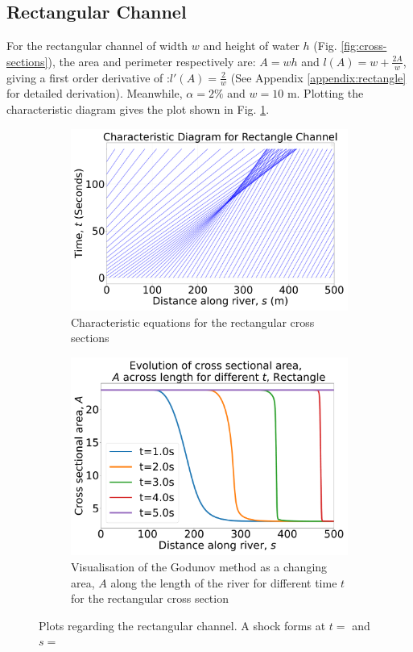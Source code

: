 \documentclass[12pt]{article}
\begin{document}
\subsection{Rectangular Channel}
For the rectangular channel of width $w$ and height of water $h$ (Fig. \ref{fig:cross-sections}), the area and perimeter respectively are: $A = wh$ and $l(A) = w + \frac{2A}{w}$, giving a first order derivative of :$l'(A) = \frac{2}{w}$ (See Appendix \ref{appendix:rectangle} for detailed derivation). Meanwhile, $\alpha = 2\%$ and $w = 10\text{ m}$. Plotting the characteristic diagram gives the plot shown in Fig. \ref{fig:rect_char}.
\begin{figure}[ht]
    \centering
    \begin{subfigure}[b]{0.49\textwidth}
        \centering
        \includegraphics[width=\textwidth]{Figures/Rectangle_characteristic.pdf}
        \caption{Characteristic equations for the rectangular cross sections}
        \label{fig:rect_char}
    \end{subfigure}
    \hfill
    \begin{subfigure}[b]{0.49\textwidth}
        \centering
        \includegraphics[width=\textwidth]{Figures/Rectangle_godunov.pdf}
        \caption{Visualisation of the Godunov method as a changing area, $A$ along the length of the river for different time $t$ for the rectangular cross section}
        \label{fig:rect_godunov}
    \end{subfigure}
    \caption{Plots regarding the rectangular channel. A shock forms at $t = $ and $s = $}
\end{figure}
\end{document}
